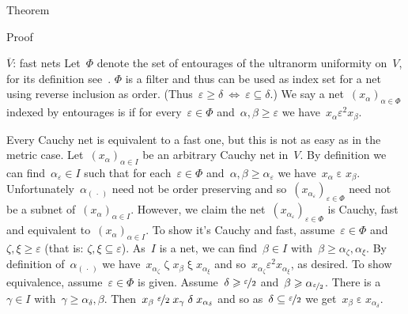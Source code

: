 \documentclass[b]{subfiles}
\begin{document}
\begin{parsec}
\begin{point}{Theorem}
\begin{point}{Proof}
\begin{point}{$\overline{V}$: fast nets}
Let~$\Phi$ denote the set of entourages of the ultranorm
    uniformity on~$V$, for its definition see~.
$\Phi$ is a filter and thus can be used as index set for a net
    using reverse inclusion as order.
    (Thus~$\varepsilon \geq \delta
    \ \Leftrightarrow\ \varepsilon \subseteq \delta$.)
We say a net~$(x_\alpha)_{\alpha \in \Phi}$  indexed by entourages
    is  if for every~$\varepsilon \in \Phi$
        and~$\alpha,\beta \geq \varepsilon$
        we have~$x_\alpha \mathrel{\varepsilon^2} x_\beta$.

Every Cauchy net is equivalent to a fast one, but this is not as
        easy as in the metric case.
Let~$(x_\alpha)_{\alpha \in I}$
    be an arbitrary Cauchy net in~$V$.
By definition we can find~$\alpha_\varepsilon \in I$
    such that for each~$\varepsilon \in \Phi$
    and~$\alpha,\beta \geq \alpha_\varepsilon$
    we have~$x_\alpha \mathrel{\varepsilon} x_\beta$.
Unfortunately~$\alpha_{(\,\cdot\,)}$ need not be order preserving
    and so~$(x_{\alpha_{\varepsilon}})_{\varepsilon\in\Phi}$
    need not be a subnet of~$(x_\alpha)_{\alpha \in I}$.
However, we claim the net~$(x_{\alpha_{\varepsilon}})_{\varepsilon\in\Phi}$
    is Cauchy, fast and equivalent to~$(x_{\alpha})_{\alpha\in I}$.
To show it's Cauchy and fast, assume~$\varepsilon \in \Phi$
    and~$\zeta,\xi \geq \varepsilon$
    (that is: $\zeta,\xi \subseteq \varepsilon$).
As~$I$ is a net, we can find~$\beta\in I$
    with~$\beta \geq \alpha_\zeta, \alpha_\xi$.
By definition of~$\alpha_{(\,\cdot\,)}$
    we have~$x_{\alpha_\zeta} \mathrel\zeta x_{\beta}
        \mathrel\xi x_{\alpha_\xi}$
        and so~$x_{\alpha_\zeta} \mathrel{\varepsilon^2}
                x_{\alpha_\xi}$, as desired.
To show equivalence, assume~$\varepsilon \in \Phi$ is given.
Assume~$\delta \geq \nicefrac{\varepsilon}{2}$
and~$\beta \geq \alpha_{\nicefrac{\varepsilon}{2}}$.
There is a~$\gamma \in I$ with~$\gamma \geq \alpha_\delta,\beta$.
Then~$x_\beta \mathrel{\nicefrac{\varepsilon}{2}}
x_{\gamma} \mathrel{\delta} x_{\alpha_{\delta}}$
and so as~$\delta\subseteq \nicefrac{\varepsilon}{2}$
we get~$x_\beta \mathrel\varepsilon x_{\alpha_\delta}$.


\end{point}
\end{point}
\end{point}
\end{parsec}
\end{document}

